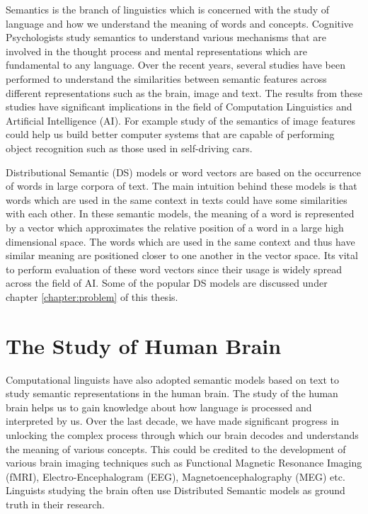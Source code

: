 \label{chapter:introduction}

Semantics is the branch of linguistics which is concerned with the study of language and how we understand the meaning of words and concepts. Cognitive Psychologists study semantics to understand various mechanisms that are involved in the thought process and mental representations which are fundamental to any language. 
Over the recent years, several studies have been performed to understand the similarities between semantic features across different representations such as the brain, image and text. The results from these studies have significant implications in the field of Computation Linguistics and Artificial Intelligence (AI). For example study of the semantics of image features could help us build better computer systems that are capable of performing object recognition such as those used in self-driving cars. 

Distributional Semantic (DS) models or word vectors are based on the occurrence of words in large corpora of text. The main intuition behind these models is that words which are used in the same context in texts could have some similarities with each other. In these semantic models, the meaning of a word is represented by a vector which approximates the relative position of a word in a large high dimensional space. The words which are used in the same context and thus have similar meaning are positioned closer to one another in the vector space. Its vital to perform evaluation of these word vectors since their usage is widely spread across the field of AI. Some of the popular DS models are discussed under chapter \ref{chapter:problem} of this thesis.

\section{The Study of Human Brain}
Computational linguists have also adopted semantic models based on text to study semantic representations in the human brain. The study of the human brain helps us to gain knowledge about how language is processed and interpreted by us. Over the last decade, we have made significant progress in unlocking the complex process through which our brain decodes and understands the meaning of various concepts. This could be credited to the development of various brain imaging techniques such as Functional Magnetic Resonance Imaging (fMRI), Electro-Encephalogram (EEG), Magnetoencephalography (MEG) etc. Linguists studying the brain often use Distributed Semantic models as ground truth in their research.


